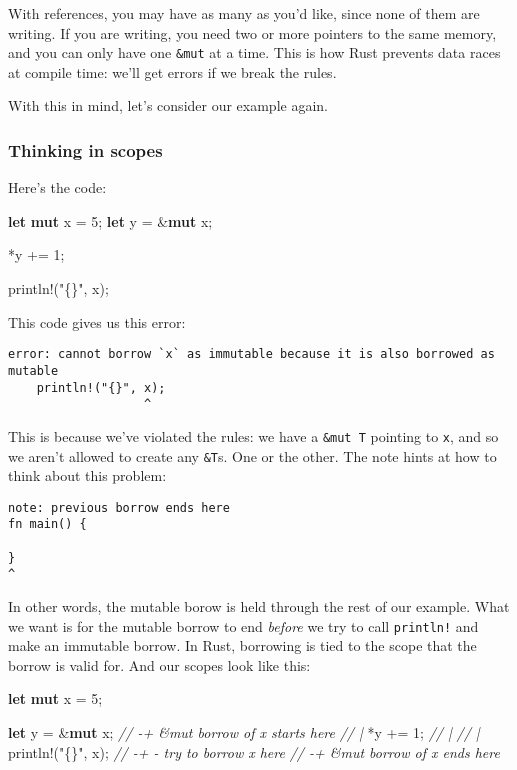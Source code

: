 \documentclass[a4paper,]{book}
\newenvironment{Shaded}{\begin{snugshade}}{\end{snugshade}}
\newcommand{\KeywordTok}[1]{\textcolor[rgb]{0.13,0.29,0.53}{\textbf{{#1}}}}
\newcommand{\DecValTok}[1]{\textcolor[rgb]{0.00,0.00,0.81}{{#1}}}
\newcommand{\StringTok}[1]{\textcolor[rgb]{0.31,0.60,0.02}{{#1}}}
\newcommand{\CommentTok}[1]{\textcolor[rgb]{0.56,0.35,0.01}{\textit{{#1}}}}
\newcommand{\OtherTok}[1]{\textcolor[rgb]{0.56,0.35,0.01}{{#1}}}
\newcommand{\NormalTok}[1]{{#1}}
\begin{document}
With references, you may have as many as you'd like, since none of them
are writing. If you are writing, you need two or more pointers to the
same memory, and you can only have one \texttt{\&mut} at a time. This is
how Rust prevents data races at compile time: we'll get errors if we
break the rules.

With this in mind, let's consider our example again.

\subsubsection{Thinking in scopes}\label{thinking-in-scopes}

Here's the code:

\begin{Shaded}
\begin{Highlighting}[]
\KeywordTok{let} \KeywordTok{mut} \NormalTok{x = }\DecValTok{5}\NormalTok{;}
\KeywordTok{let} \NormalTok{y = &}\KeywordTok{mut} \NormalTok{x;}

\NormalTok{*y += }\DecValTok{1}\NormalTok{;}

\OtherTok{println!}\NormalTok{(}\StringTok{"\{\}"}\NormalTok{, x);}
\end{Highlighting}
\end{Shaded}

This code gives us this error:

\begin{verbatim}
error: cannot borrow `x` as immutable because it is also borrowed as mutable
    println!("{}", x);
                   ^
\end{verbatim}

This is because we've violated the rules: we have a \texttt{\&mut\ T}
pointing to \texttt{x}, and so we aren't allowed to create any
\texttt{\&T}s. One or the other. The note hints at how to think about
this problem:

\begin{verbatim}
note: previous borrow ends here
fn main() {

}
^
\end{verbatim}

In other words, the mutable borow is held through the rest of our
example. What we want is for the mutable borrow to end \emph{before} we
try to call \texttt{println!} and make an immutable borrow. In Rust,
borrowing is tied to the scope that the borrow is valid for. And our
scopes look like this:

\begin{Shaded}
\begin{Highlighting}[]
\KeywordTok{let} \KeywordTok{mut} \NormalTok{x = }\DecValTok{5}\NormalTok{;}

\KeywordTok{let} \NormalTok{y = &}\KeywordTok{mut} \NormalTok{x;    }\CommentTok{// -+ &mut borrow of x starts here}
                   \CommentTok{//  |}
\NormalTok{*y += }\DecValTok{1}\NormalTok{;           }\CommentTok{//  |}
                   \CommentTok{//  |}
\OtherTok{println!}\NormalTok{(}\StringTok{"\{\}"}\NormalTok{, x); }\CommentTok{// -+ - try to borrow x here}
                   \CommentTok{// -+ &mut borrow of x ends here}
\end{Highlighting}
\end{Shaded}
\end{document}
